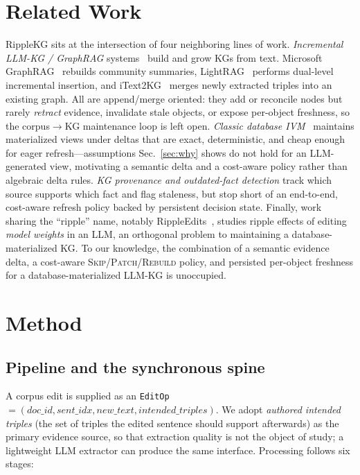 \documentclass[conference]{IEEEtran}
\begin{document}
\section{Related Work}
RippleKG sits at the intersection of four neighboring lines of work.
\emph{Incremental LLM-KG / GraphRAG} systems~\cite{graphrag,lightrag,itext2kg}
build and grow KGs from text. Microsoft GraphRAG~\cite{graphrag} rebuilds
community summaries, LightRAG~\cite{lightrag} performs dual-level incremental
insertion, and iText2KG~\cite{itext2kg} merges newly extracted triples into an
existing graph. All are append/merge oriented: they add or reconcile nodes but
rarely \emph{retract} evidence, invalidate stale objects, or expose per-object
freshness, so the corpus$\rightarrow$KG maintenance loop is left open.
\emph{Classic database IVM}~\cite{guptamumick,dbtoaster,diffdataflow} maintains
materialized views under deltas that are exact, deterministic, and cheap enough
for eager refresh---assumptions Sec.~\ref{sec:why} shows do not hold for an
LLM-generated view, motivating a semantic delta and a cost-aware policy rather
than algebraic delta rules. \emph{KG provenance and outdated-fact detection}
track which source supports which fact and flag staleness, but stop short of an
end-to-end, cost-aware refresh policy backed by persistent decision state.
Finally, work sharing the ``ripple'' name, notably RippleEdits~\cite{rippleedits},
studies ripple effects of editing \emph{model weights} in an LLM, an orthogonal
problem to maintaining a database-materialized KG. To our knowledge, the
combination of a semantic evidence delta, a cost-aware
\textsc{Skip}/\textsc{Patch}/\textsc{Rebuild} policy, and persisted per-object
freshness for a database-materialized LLM-KG is unoccupied.

\section{Method}
\label{sec:method}

\subsection{Pipeline and the synchronous spine}
A corpus edit is supplied as an \texttt{EditOp}$=(\textit{doc\_id},
\textit{sent\_idx}, \textit{new\_text}, \textit{intended\_triples})$. We adopt
\emph{authored intended triples} (the set of triples the edited sentence should
support afterwards) as the primary evidence source, so that extraction quality
is not the object of study; a lightweight LLM extractor can produce the same
interface. Processing follows six stages:
\end{document}
